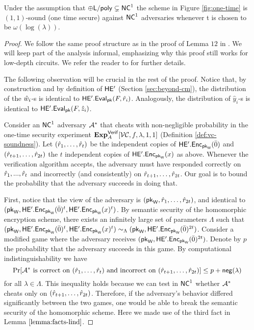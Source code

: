 \begin{lemma} 
\label{lemma:one-time}
Under the assumption that $\oplus {\ensuremath{\mathsf{L}}} / \mathsf{poly} \subsetneq {\ensuremath{\mathsf{NC}}}^1$ the  scheme in Figure \ref{fig:one-time} is $(1,1)$-sound (one time secure) against ${\mathsf{NC}}^1$ adversaries whenever t is chosen to be  $\omega(\log(\lambda))$.
\end{lemma}
\begin{proof}
We follow the same proof structure as in the proof of Lemma $12$ in \cite{ckv10}. We will keep part of the analysis informal, emphasizing why this proof still works for low-depth circuits. We refer the reader to \cite{ckv10} for further details.

The following observation will be crucial in the rest of the proof. Notice that, by construction and by definition of $\mathsf{HE'}$ (Section \ref{sec:beyond-cm}), the distribution of the $\hat{w}_i$-s is identical to $\mathsf{HE'.Eval}_{\mathsf{pk}}(F, \hat{r}_i)$. Analogously, the distribution of $\hat{y}_i$-s is identical to $\mathsf{HE'.Eval}_{\mathsf{pk}}(F, \hat{z}_i)$.

Consider an ${\mathsf{NC}}^1$ adversary $\mathcal{A}^*$ that cheats with non-negligible probability in the one-time security experiment ${\bf Exp}^{\mathsf{Verif}}_{A}[{\cal VC}, f, \lambda, 1,1]$ (Definition \ref{def:vc-soundness}).
Let $(\hat{r}_1,\dots,\hat{r}_{t})$ be the independent copies of $\mathsf{HE'.Enc}_{\mathsf{pk}_{\mathsf{W}}}(\bar{0})$ and  $(\hat{r}_{t+1},\dots,\hat{r}_{2t})$ the $t$ independent copies of
$\mathsf{HE'.Enc}_{\mathsf{pk}_{\mathsf{W}}}(x)$ as above. 
Whenever the verification algorithm accepts, the adversary must have responded correctly on $\hat{r}_1,...,\hat{r}_t$ and incorrectly (and consistently) on $\hat{r}_{t+1},\dots,\hat{r}_{2t}$. 
Our goal is to bound the probability that the adversary succeeds in doing that. 

First, notice that the view of the adversary is
$(\mathsf{pk}_{\mathsf{W}}, \hat{r}_1,\dots,\hat{r}_{2t})$, and identical to $(\mathsf{pk}_{\mathsf{W}}, \mathsf{HE'.Enc}_{\mathsf{pk}_{\mathsf{W}}}(\bar{0})^t, \mathsf{HE'.Enc}_{\mathsf{pk}_{\mathsf{W}}}(x)^t)$.
By semantic security of the homomorphic encryption scheme, there exists an infinitely large set of parameters $\Lambda$ such that $ (\mathsf{pk}_{\mathsf{W}}, \mathsf{HE'.Enc}_{\mathsf{pk}_{\mathsf{W}}}(\bar{0})^t, \mathsf{HE'.Enc}_{\mathsf{pk}_{\mathsf{W}}}(x)^t) \sim_{\Lambda} (\mathsf{pk}_{\mathsf{W}}, \mathsf{HE'.Enc}_{\mathsf{pk}_{\mathsf{W}}}(\bar{0})^{2t})$. Consider a modified game where the adversary receives  $(\mathsf{pk}_{\mathsf{W}}, \mathsf{HE'.Enc}_{\mathsf{pk}_{\mathsf{W}}}(\bar{0})^{2t})$. Denote by $p$ the probability that the adversary succeeds in this game. By computational indistinguishability we have
\[
\Pr[\mathcal{A}^* \text{ is correct on } (\hat{r}_1,\dots,\hat{r}_{t}) \text{ and incorrect on } (\hat{r}_{t+1},\dots,\hat{r}_{2t}) ] \leq p + \mathsf{neg}(\lambda)
\]
for all $\lambda \in \Lambda$.
This inequality holds because we can test in ${\mathsf{NC}}^1$ whether $\mathcal{A}^*$ cheats only on $(\hat{r}_{t+1},\dots,\hat{r}_{2t})$. Therefore, if the adversary's behavior differed significantly between the two games, one would be able to break the semantic security of the homomorphic scheme. Here we made use of the third fact in Lemma $\ref{lemma:facts-lind}$.


\end{proof}

